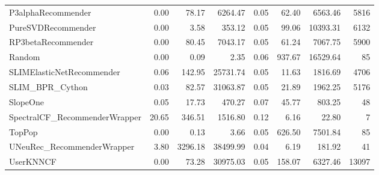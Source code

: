\begin{tabular}{lrrrrrrr}
P3alphaRecommender                 &          0.00 &    78.17 &  6264.47 &         0.05 &   62.40 &  6563.46 &       5816 \\
PureSVDRecommender                 &          0.00 &     3.58 &   353.12 &         0.05 &   99.06 & 10393.31 &       6132 \\
RP3betaRecommender                 &          0.00 &    80.45 &  7043.17 &         0.05 &   61.24 &  7067.75 &       5900 \\
Random                             &          0.00 &     0.09 &     2.35 &         0.06 &  937.67 & 16529.64 &         85 \\
SLIMElasticNetRecommender          &          0.06 &   142.95 & 25731.74 &         0.05 &   11.63 &  1816.69 &       4706 \\
SLIM_BPR_Cython                    &          0.03 &    82.57 & 31063.87 &         0.05 &   21.89 &  1962.25 &       5176 \\
SlopeOne                           &          0.05 &    17.73 &   470.27 &         0.07 &   45.77 &   803.25 &         48 \\
SpectralCF_RecommenderWrapper      &         20.65 &   346.51 &  1516.80 &         0.12 &    6.16 &    22.80 &          7 \\
TopPop                             &          0.00 &     0.13 &     3.66 &         0.05 &  626.50 &  7501.84 &         85 \\
UNeuRec_RecommenderWrapper         &          3.80 &  3296.18 & 38499.99 &         0.04 &    6.19 &   181.92 &         41 \\
UserKNNCF                          &          0.00 &    73.28 & 30975.03 &         0.05 &  158.07 &  6327.46 &      13097 \\
\bottomrule
\end{tabular}

